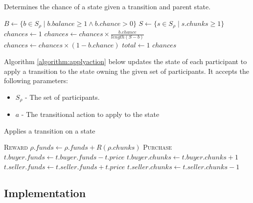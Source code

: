 \begin{algorithm}[H]
\caption{Determines the chance of a state given a transition and parent state. }
\label{algorithm:calculatestatechance}
\begin{algorithmic}[1]
    \State $B \gets \{ b \in S_\rho \mid b.balance \geq 1 \land b.chance > 0 \}$
    \State $S \gets \{ s \in S_\rho \mid s.chunks \geq 1 \}$
    \State $chances \gets 1$
            \State $chances \gets chances \times \frac{b.chance}{length(S - b)}$
        \Else
            \State $chances \gets chances \times (1 - b.chance)$
        \EndIf
    \EndFor
    \State $total \gets 1$
    \State \Return $chances$
\EndProcedure
\end{algorithmic}
\end{algorithm}

Algorithm \ref{algorithm:applyaction} below updates the state of each participant to apply a transition to the state owning the given set of participants. It accepts the following parameters:

\begin{itemize}
    \item $S_\rho$ - The set of participants.
    \item $a$ - The transitional action to apply to the state
\end{itemize}

\begin{algorithm}[H]
\caption{Applies a transition on a state}
\label{algorithm:applyaction}
\begin{algorithmic}[1]
        \Case \textsc{Reward}
                \State $\rho.funds \gets \rho.funds + R(\rho.chunks)$ 
            \EndFor
        \EndCase
        \Case \textsc{Purchase}
                \State $t.buyer.funds \gets t.buyer.funds - t.price$
                \State $t.buyer.chunks \gets t.buyer.chunks + 1$
                \State $t.seller.funds \gets t.seller.funds + t.price$
                \State $t.seller.chunks \gets t.seller.chunks - 1$
            \EndFor
        \EndCase
    \EndSwitch
\EndProcedure
\end{algorithmic}
\end{algorithm}

\subsection{Implementation}

